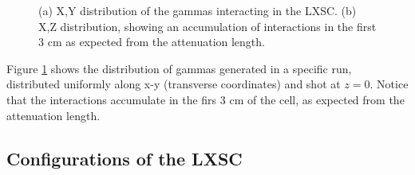 \begin{figure}[!htb]
        \begin{center}
                \caption{\label{fig.distNewgen} (a) X,Y distribution of the gammas interacting in the LXSC. (b) X,Z distribution, showing an accumulation of interactions in the first 3 cm  as expected from the attenuation length.}
        \end{center}
\end{figure}

 Figure \ref{fig.distNewgen} shows the distribution of gammas generated in a specific run, distributed uniformly along x-y (transverse coordinates) and shot at $z=0$. Notice that the interactions accumulate in the firs 3 cm of the cell, as expected from the attenuation length.  
 
 \subsection{Configurations of the LXSC}

